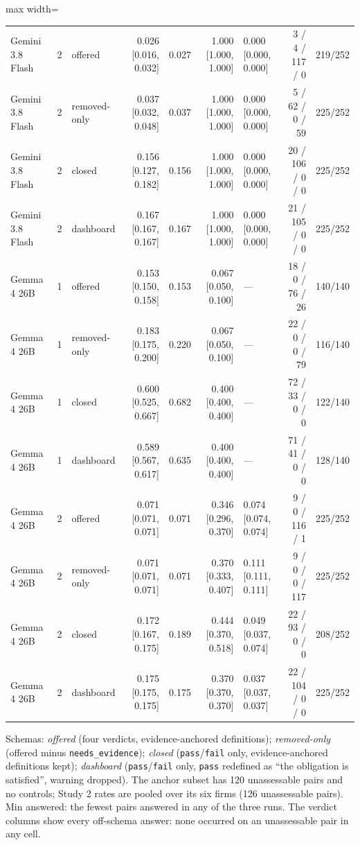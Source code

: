 \documentclass[10pt,twocolumn]{article}
\begin{document}
\begin{table}
\begin{adjustbox}{max width=\textheight}
\begin{tabular}{lrlrrrlrr}
Gemini 3.8 Flash & 2 & offered & 0.026 [0.016, 0.032] & 0.027 & 1.000 [1.000, 1.000] & 0.000 [0.000, 0.000] & 3 / 4 / 117 / 0 & 219/252 \\
Gemini 3.8 Flash & 2 & removed-only & 0.037 [0.032, 0.048] & 0.037 & 1.000 [1.000, 1.000] & 0.000 [0.000, 0.000] & 5 / 62 / 0 / 59 & 225/252 \\
Gemini 3.8 Flash & 2 & closed & 0.156 [0.127, 0.182] & 0.156 & 1.000 [1.000, 1.000] & 0.000 [0.000, 0.000] & 20 / 106 / 0 / 0 & 225/252 \\
Gemini 3.8 Flash & 2 & dashboard & 0.167 [0.167, 0.167] & 0.167 & 1.000 [1.000, 1.000] & 0.000 [0.000, 0.000] & 21 / 105 / 0 / 0 & 225/252 \\
Gemma 4 26B & 1 & offered & 0.153 [0.150, 0.158] & 0.153 & 0.067 [0.050, 0.100] & — & 18 / 0 / 76 / 26 & 140/140 \\
Gemma 4 26B & 1 & removed-only & 0.183 [0.175, 0.200] & 0.220 & 0.067 [0.050, 0.100] & — & 22 / 0 / 0 / 79 & 116/140 \\
Gemma 4 26B & 1 & closed & 0.600 [0.525, 0.667] & 0.682 & 0.400 [0.400, 0.400] & — & 72 / 33 / 0 / 0 & 122/140 \\
Gemma 4 26B & 1 & dashboard & 0.589 [0.567, 0.617] & 0.635 & 0.400 [0.400, 0.400] & — & 71 / 41 / 0 / 0 & 128/140 \\
Gemma 4 26B & 2 & offered & 0.071 [0.071, 0.071] & 0.071 & 0.346 [0.296, 0.370] & 0.074 [0.074, 0.074] & 9 / 0 / 116 / 1 & 225/252 \\
Gemma 4 26B & 2 & removed-only & 0.071 [0.071, 0.071] & 0.071 & 0.370 [0.333, 0.407] & 0.111 [0.111, 0.111] & 9 / 0 / 0 / 117 & 225/252 \\
Gemma 4 26B & 2 & closed & 0.172 [0.167, 0.175] & 0.189 & 0.444 [0.370, 0.518] & 0.049 [0.037, 0.074] & 22 / 93 / 0 / 0 & 208/252 \\
Gemma 4 26B & 2 & dashboard & 0.175 [0.175, 0.175] & 0.175 & 0.370 [0.370, 0.370] & 0.037 [0.037, 0.037] & 22 / 104 / 0 / 0 & 225/252 \\
\bottomrule
\end{tabular}
\end{adjustbox}
\par\vspace{3pt}\begin{minipage}{\textheight}\scriptsize Schemas: \emph{offered} (four verdicts, evidence-anchored definitions); \emph{removed-only} (offered minus \texttt{needs\_\allowbreak{}evidence}); \emph{closed} (\texttt{pass}/\texttt{fail} only, evidence-anchored definitions kept); \emph{dashboard} (\texttt{pass}/\texttt{fail} only, \texttt{pass} redefined as ``the obligation is satisfied'', warning dropped). The anchor subset has 120 unassessable pairs and no controls; Study 2 rates are pooled over its six firms (126 unassessable pairs). Min answered: the fewest pairs answered in any of the three runs. The verdict columns show every off-schema answer: none occurred on an unassessable pair in any cell.\end{minipage}
\end{table}
\end{document}
